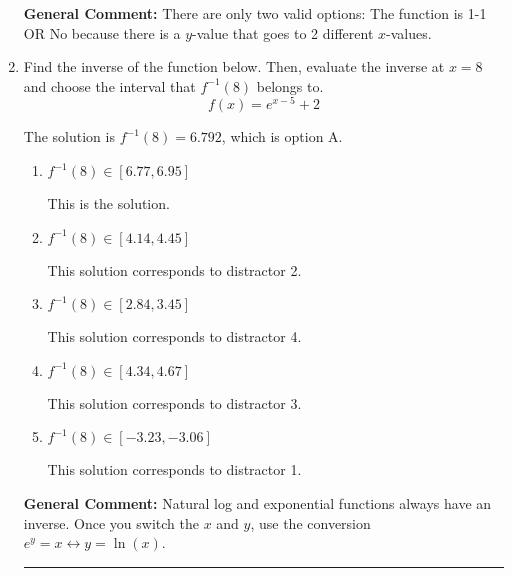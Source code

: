 \documentclass{extbook}[14pt]
\newcommand{\litem}[1]{\item #1

\rule{\textwidth}{0.4pt}}
\begin{document}
\begin{enumerate}
{\textbf{General Comment:} There are only two valid options: The function is 1-1 OR No because there is a $y$-value that goes to 2 different $x$-values.
}
\litem{
Find the inverse of the function below. Then, evaluate the inverse at $x = 8$ and choose the interval that $f^{-1}(8)$ belongs to.
\[ f(x) = e^{x-5}+2 \]

The solution is \( f^{-1}(8) = 6.792 \), which is option A.\begin{enumerate}[label=\Alph*.]
\item \( f^{-1}(8) \in [6.77, 6.95] \)

 This is the solution.
\item \( f^{-1}(8) \in [4.14, 4.45] \)

 This solution corresponds to distractor 2.
\item \( f^{-1}(8) \in [2.84, 3.45] \)

 This solution corresponds to distractor 4.
\item \( f^{-1}(8) \in [4.34, 4.67] \)

 This solution corresponds to distractor 3.
\item \( f^{-1}(8) \in [-3.23, -3.06] \)

 This solution corresponds to distractor 1.
\end{enumerate}

\textbf{General Comment:} Natural log and exponential functions always have an inverse. Once you switch the $x$ and $y$, use the conversion $ e^y = x \leftrightarrow y=\ln(x)$.
}
\end{enumerate}
\end{document}
